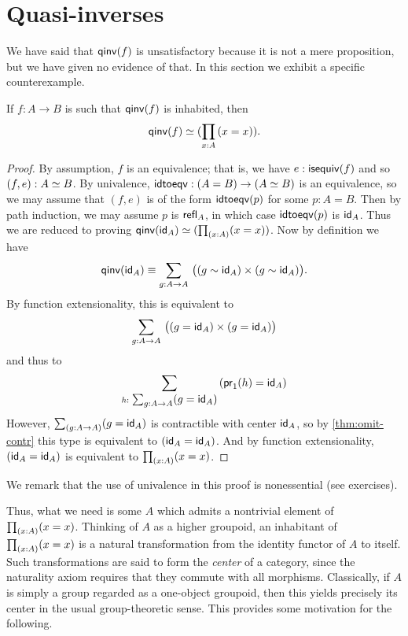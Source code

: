 \section{Quasi-inverses}
\label{sec:quasi-inverses}

We have said that $\qinv(f)$ is unsatisfactory because it is not a mere proposition, but we have given no evidence of that.
In this section we exhibit a specific counterexample.

\begin{lem}\label{lem:qinv-autohtpy}
  If $f:A\to B$ is such that $\qinv (f)$ is inhabited, then
  \[\eqv{\qinv(f)}{(\prd{x:A}(x=x))}.\]
\end{lem}
\begin{proof}
  By assumption, $f$ is an equivalence; that is, we have $e:\isequiv(f)$ and so $(f,e):\eqv A B$.
  By univalence, $\idtoeqv:(A=B) \to (\eqv A B)$ is an equivalence, so we may assume that $(f,e)$ is of the form $\idtoeqv(p)$ for some $p:A=B$.
  Then by path induction, we may assume $p$ is $\refl{A}$, in which case $\idtoeqv(p)$ is $\idfunc[A]$.
  Thus we are reduced to proving $\eqv{\qinv(\idfunc[A])}{(\prd{x:A}(x=x))}$.
  Now by definition we have
  \[ \qinv(\idfunc[A]) \jdeq
  \sm{g:A\to A} \big((g \htpy \idfunc[A]) \times (g \htpy \idfunc[A])\big).
  \]
  By function extensionality, this is equivalent to
  \[ \sm{g:A\to A} \big((g = \idfunc[A]) \times (g = \idfunc[A])\big)
  \]
  and thus to
  \[ \sm{h:\textstyle\sum_{g:A\to A} (g = \idfunc[A])} (\proj1(h) = \idfunc[A])
  \]
  However, $\sm{g:A\to A} (g = \idfunc[A])$ is contractible with center $\idfunc[A]$, so by \autoref{thm:omit-contr} this type is equivalent to $(\idfunc[A] = \idfunc[A])$.
  And by function extensionality, $(\idfunc[A] = \idfunc[A])$ is equivalent to $\prd{x:A}(x=x)$.
\end{proof}
We remark that the use of univalence in this proof is nonessential (see exercises).

Thus, what we need is some $A$ which admits a nontrivial element of $\prd{x:A}(x=x)$.
Thinking of $A$ as a higher groupoid, an inhabitant of $\prd{x:A}(x=x)$ is a natural transformation from the identity functor of $A$ to itself.
Such transformations are said to form the \emph{center} of a category, since the naturality axiom requires that they commute with all morphisms.
Classically, if $A$ is simply a group regarded as a one-object groupoid, then this yields precisely its center in the usual group-theoretic sense.
This provides some motivation for the following.

